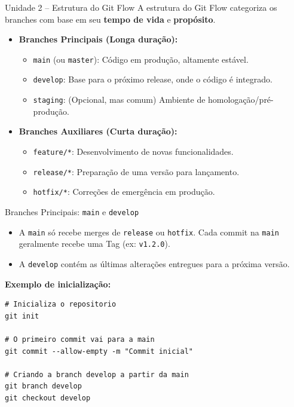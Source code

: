 \documentclass[aspectratio=169]{beamer}
\begin{document}
\begin{frame}{Unidade 2 -- Estrutura do Git Flow}
    A estrutura do Git Flow categoriza os branches com base em seu \textbf{tempo de vida} e \textbf{propósito}.
    
    \vspace{0.5cm}
    \begin{itemize}
        \item \textbf{Branches Principais (Longa duração):}
        \begin{itemize}
            \item \texttt{main} (ou \texttt{master}): Código em produção, altamente estável.
            \item \texttt{develop}: Base para o próximo release, onde o código é integrado.
            \item \texttt{staging}: (Opcional, mas comum) Ambiente de homologação/pré-produção.
        \end{itemize}
        \vspace{0.3cm}
        \item \textbf{Branches Auxiliares (Curta duração):}
        \begin{itemize}
            \item \texttt{feature/*}: Desenvolvimento de novas funcionalidades.
            \item \texttt{release/*}: Preparação de uma versão para lançamento.
            \item \texttt{hotfix/*}: Correções de emergência em produção.
        \end{itemize}
    \end{itemize}
\end{frame}

\begin{frame}[fragile]{Branches Principais: \texttt{main} e \texttt{develop}}
    \begin{itemize}
        \item A \texttt{main} só recebe merges de \texttt{release} ou \texttt{hotfix}. Cada commit na \texttt{main} geralmente recebe uma Tag (ex: \texttt{v1.2.0}).
        \item A \texttt{develop} contém as últimas alterações entregues para a próxima versão.
    \end{itemize}
    \vspace{0.3cm}
    \textbf{Exemplo de inicialização:}
\begin{lstlisting}
# Inicializa o repositorio
git init

# O primeiro commit vai para a main
git commit --allow-empty -m "Commit inicial"

# Criando a branch develop a partir da main
git branch develop
git checkout develop
\end{lstlisting}
\end{frame}
\end{document}
